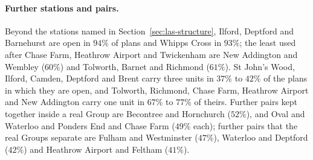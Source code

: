 \documentclass[11pt]{article}
\theoremstyle{definition}
\begin{document}
\paragraph{Further stations and pairs.}
Beyond the stations named in Section~\ref{sec:las-structure}, Ilford, Deptford and Barnehurst are open in $94\%$ of plans and Whipps Cross in $93\%$; the least used after Chase Farm, Heathrow Airport and Twickenham are New Addington and Wembley ($60\%$) and Tolworth, Barnet and Richmond ($61\%$). St John's Wood, Ilford, Camden, Deptford and Brent carry three units in $37\%$ to $42\%$ of the plans in which they are open, and Tolworth, Richmond, Chase Farm, Heathrow Airport and New Addington carry one unit in $67\%$ to $77\%$ of theirs. Further pairs kept together inside a real Group are Becontree and Hornchurch ($52\%$), and Oval and Waterloo and Ponders End and Chase Farm ($49\%$ each); further pairs that the real Groups separate are Fulham and Westminster ($47\%$), Waterloo and Deptford ($42\%$) and Heathrow Airport and Feltham ($41\%$).
\end{document}
